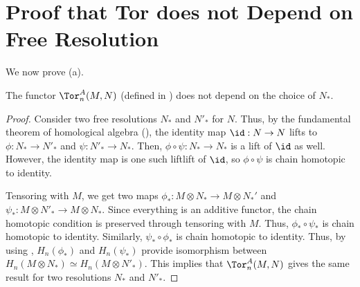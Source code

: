 \section{Proof that Tor does not Depend on Free Resolution}
We now prove  (a).
\begin{theorem}
    \label{thm:tor_free_res}
    The functor $\Tor_n^A(M,N)$ 
    (defined in ) does not depend on the 
    choice of $N_*$.
\end{theorem}
\begin{proof}
    Consider two free resolutions $N_*$ and $N'_*$
    for $N$. Thus, by the fundamental theorem of homological algebra (),
    the identity map $\id : N\to N$ lifts to 
    $\phi : N_* \to N'_*$ and $\psi : N'_*\to N_*$.
    Then, $\phi\circ\psi : N_*\to N_*$
    is a lift of $\id$ as well. However, the identity map
    is one such liftlift of $\id$, so $\phi\circ\psi$
    is chain homotopic to identity.
    
    Tensoring with $M$, we get two maps
    $\phi_* : M\otimes N_* \to M\otimes N_*'$
    and $\psi_* : M\otimes N'_* \to M\otimes N_*$.
    Since everything is an additive functor,
    the chain homotopic condition is preserved through
    tensoring with $M$. 
    Thus, $\phi_*\circ\psi_*$ is chain homotopic to identity.
    Similarly, $\psi_* \circ\phi_*$ is chain homotopic to identity.
    Thus, by using ,
    $H_n(\phi_*)$ and $H_n(\psi_*)$
    provide isomorphism between
    $H_n(M\otimes N_*) \simeq H_n(M\otimes N'_*)$.
    This implies that $\Tor_n^A(M,N)$ gives the same result
    for two resolutions $N_*$ and $N'_*$.
\end{proof}
